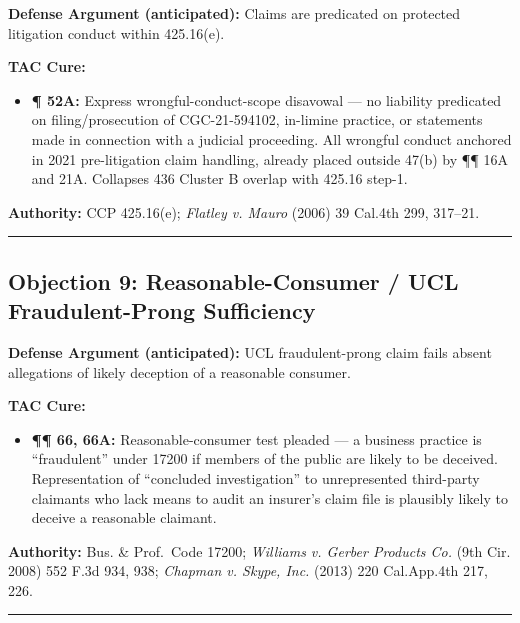 \textbf{Defense Argument (anticipated):} Claims are predicated on protected litigation conduct within \textsection{} 425.16(e).

\textbf{TAC Cure:}

\begin{itemize}
\tightlist
\item
  \textbf{¶ 52A:} Express wrongful-conduct-scope disavowal --- no liability predicated on filing/prosecution of CGC-21-594102, in-limine practice, or statements made in connection with a judicial proceeding. All wrongful conduct anchored in 2021 pre-litigation claim handling, already placed outside \textsection{} 47(b) by ¶¶ 16A and 21A. Collapses \textsection{} 436 Cluster B overlap with \textsection{} 425.16 step-1.
\end{itemize}

\textbf{Authority:} CCP \textsection{} 425.16(e); \emph{Flatley v. Mauro} (2006) 39 Cal.4th 299, 317--21.

\begin{center}\rule{0.5\linewidth}{0.5pt}\end{center}

\subsection{Objection 9: Reasonable-Consumer / UCL Fraudulent-Prong Sufficiency}\label{objection-9-reasonable-consumer-ucl-fraudulent-prong-sufficiency}

\textbf{Defense Argument (anticipated):} UCL fraudulent-prong claim fails absent allegations of likely deception of a reasonable consumer.

\textbf{TAC Cure:}

\begin{itemize}
\tightlist
\item
  \textbf{¶¶ 66, 66A:} Reasonable-consumer test pleaded --- a business practice is ``fraudulent'' under \textsection{} 17200 if members of the public are likely to be deceived. Representation of ``concluded investigation'' to unrepresented third-party claimants who lack means to audit an insurer's claim file is plausibly likely to deceive a reasonable claimant.
\end{itemize}

\textbf{Authority:} Bus. \& Prof.~Code \textsection{} 17200; \emph{Williams v. Gerber Products Co.} (9th Cir. 2008) 552 F.3d 934, 938; \emph{Chapman v. Skype, Inc.} (2013) 220 Cal.App.4th 217, 226.

\begin{center}\rule{0.5\linewidth}{0.5pt}\end{center}

